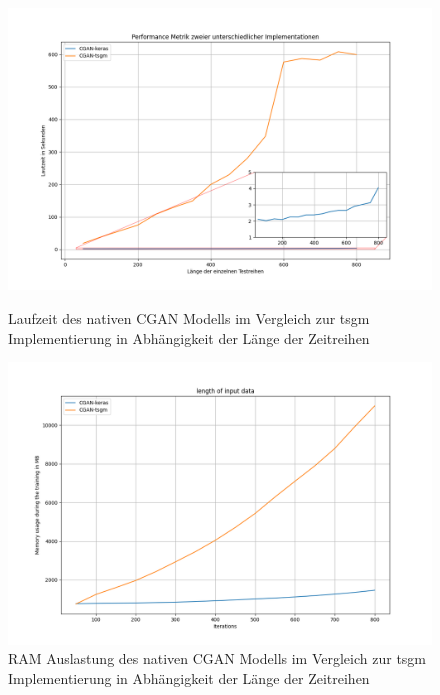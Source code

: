 \begin{figure}[ht]
    \centering
    \begin{minipage}{0.5\textwidth}
        \centering
        \includegraphics[width=\textwidth]{includes/figures/compare_run_time_iterations.png}
        \caption{Laufzeit des nativen CGAN Modells im Vergleich zur tsgm Implementierung in Abhängigkeit der Länge der Zeitreihen}
        \label{fig:compare_run_time_iterations}
    \end{minipage}\hfill
    \begin{minipage}{0.5\textwidth}
        \centering
        \includegraphics[width=\textwidth]{includes/figures/ram_usage_tsgm_vs_keras.png}
        \caption{RAM Auslastung des nativen CGAN Modells im Vergleich zur tsgm Implementierung in Abhängigkeit der Länge der Zeitreihen}
        \label{fig:compare_ram_usage}
    \end{minipage}
\end{figure}


